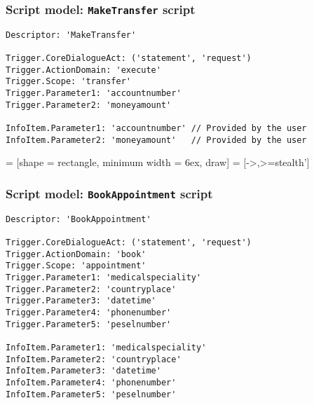 \documentclass[11pt]{beamer}
\begin{document}
\begin{frame}[fragile]
\frametitle{Script model: \texttt{MakeTransfer} script}
\scriptsize
\begin{lstlisting}[language=lekta]
Descriptor: 'MakeTransfer'

Trigger.CoreDialogueAct: ('statement', 'request')
Trigger.ActionDomain: 'execute' 
Trigger.Scope: 'transfer'
Trigger.Parameter1: 'accountnumber'			
Trigger.Parameter2: 'moneyamount'			
			
InfoItem.Parameter1: 'accountnumber' // Provided by the user
InfoItem.Parameter2: 'moneyamount'   // Provided by the user
\end{lstlisting}

 = [shape            = rectangle,
                           minimum width    = 6ex,%
                           draw]
   = [->,>=stealth']      
\begin{center}
\end{center}
\end{frame}


\begin{frame}[fragile]
\frametitle{Script model: \texttt{BookAppointment} script}
\scriptsize
\begin{lstlisting}[language=lekta]
Descriptor: 'BookAppointment'

Trigger.CoreDialogueAct: ('statement', 'request')
Trigger.ActionDomain: 'book' 
Trigger.Scope: 'appointment'
Trigger.Parameter1: 'medicalspeciality'			
Trigger.Parameter2: 'countryplace'			
Trigger.Parameter3: 'datetime'			
Trigger.Parameter4: 'phonenumber'			
Trigger.Parameter5: 'peselnumber'			

InfoItem.Parameter1: 'medicalspeciality' 
InfoItem.Parameter2: 'countryplace'      
InfoItem.Parameter3: 'datetime'          
InfoItem.Parameter4: 'phonenumber'       
InfoItem.Parameter5: 'peselnumber'       
\end{lstlisting}
\end{frame}
\end{document}
